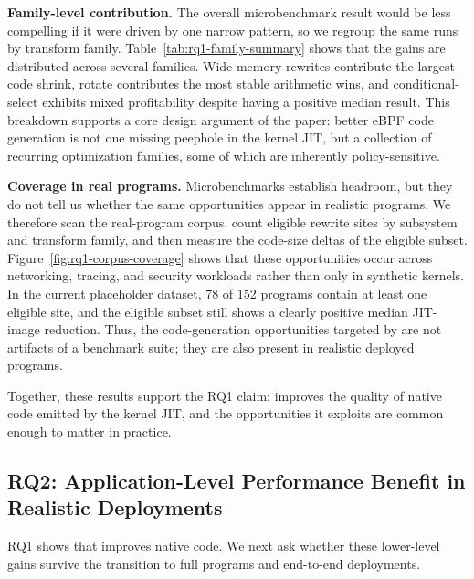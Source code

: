 

\noindent\textbf{Family-level contribution.}
The overall microbenchmark result would be less compelling if it were driven by one narrow pattern, so we regroup the same runs by transform family. Table~\ref{tab:rq1-family-summary} shows that the gains are distributed across several families. Wide-memory rewrites contribute the largest code shrink, rotate contributes the most stable arithmetic wins, and conditional-select exhibits mixed profitability despite having a positive median result. This breakdown supports a core design argument of the paper: better eBPF code generation is not one missing peephole in the kernel JIT, but a collection of recurring optimization families, some of which are inherently policy-sensitive.



\noindent\textbf{Coverage in real programs.}
Microbenchmarks establish headroom, but they do not tell us whether the same opportunities appear in realistic programs. We therefore scan the real-program corpus, count eligible rewrite sites by subsystem and transform family, and then measure the code-size deltas of the eligible subset. Figure~\ref{fig:rq1-corpus-coverage} shows that these opportunities occur across networking, tracing, and security workloads rather than only in synthetic kernels. In the current placeholder dataset, 78 of 152 programs contain at least one eligible site, and the eligible subset still shows a clearly positive median JIT-image reduction. Thus, the code-generation opportunities targeted by \tool are not artifacts of a benchmark suite; they are also present in realistic deployed programs.



Together, these results support the RQ1 claim: \tool improves the quality of native code emitted by the kernel JIT, and the opportunities it exploits are common enough to matter in practice.

\subsection{RQ2: Application-Level Performance Benefit in Realistic Deployments}
\label{subsec:rq2}

RQ1 shows that \tool improves native code. We next ask whether these lower-level gains survive the transition to full programs and end-to-end deployments.

